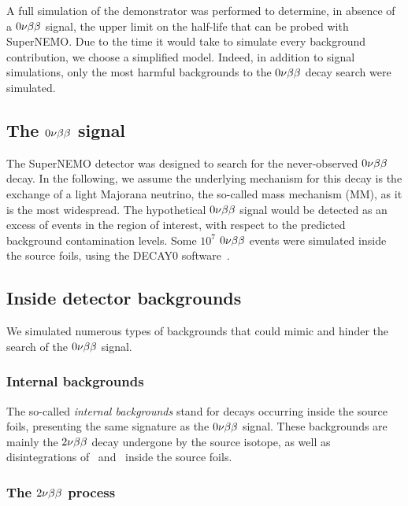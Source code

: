 A full simulation of the demonstrator was performed to determine, in absence of a $0\nu\beta\beta$ signal, the upper limit on the half-life that can be probed with SuperNEMO.
Due to the time it would take to simulate every background contribution, we choose a simplified model.
Indeed, in addition to signal simulations, only the most harmful backgrounds to the $0\nu\beta\beta$ decay search were simulated.

\subsection{The $0\nu\beta\beta$ signal}

The SuperNEMO detector was designed to search for the never-observed $0\nu\beta\beta$ decay.
In the following, we assume the underlying mechanism for this decay is the exchange of a light Majorana neutrino, the so-called mass mechanism (MM), as it is the most widespread.
The hypothetical $0\nu\beta\beta$ signal would be detected as an excess of events in the region of interest, with respect to the predicted background contamination levels.
Some $10^{7}$ $0\nu\beta\beta$ events were simulated inside the source foils, using the DECAY$0$ software~\cite{art:decay0}.

\subsection{Inside detector backgrounds}

We simulated numerous types of backgrounds that could mimic and hinder the search of the $0\nu\beta\beta$ signal.

\subsubsection{Internal backgrounds}

The so-called \emph{internal backgrounds} stand for decays occurring inside the source foils, presenting the same signature as the $0\nu\beta\beta$ signal.
These backgrounds are mainly the $2\nu\beta\beta$ decay undergone by the source isotope, as well as disintegrations of \Tl\ and \Bi\ inside the source foils.

\subsubsection*{The $2\nu\beta\beta$ process}


